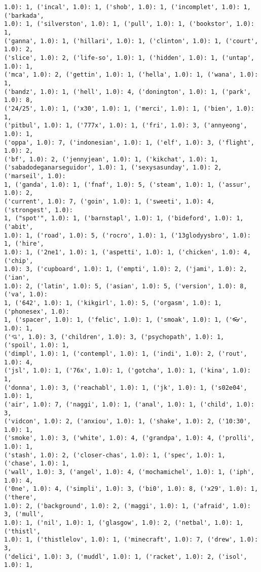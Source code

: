 \documentclass[11pt]{article}
\begin{document}
\begin{Verbatim}[commandchars=\\\{\}]
1.0): 1, ('incal', 1.0): 1, ('shob', 1.0): 1, ('incomplet', 1.0): 1, ('barkada',
1.0): 1, ('silverston', 1.0): 1, ('pull', 1.0): 1, ('bookstor', 1.0): 1,
('ganna', 1.0): 1, ('hillari', 1.0): 1, ('clinton', 1.0): 1, ('court', 1.0): 2,
('slice', 1.0): 2, ('life-so', 1.0): 1, ('hidden', 1.0): 1, ('untap', 1.0): 1,
('mca', 1.0): 2, ('gettin', 1.0): 1, ('hella', 1.0): 1, ('wana', 1.0): 1,
('bandz', 1.0): 1, ('hell', 1.0): 4, ('donington', 1.0): 1, ('park', 1.0): 8,
('24/25', 1.0): 1, ('x30', 1.0): 1, ('merci', 1.0): 1, ('bien', 1.0): 1,
('pitbul', 1.0): 1, ('777x', 1.0): 1, ('fri', 1.0): 3, ('annyeong', 1.0): 1,
('oppa', 1.0): 7, ('indonesian', 1.0): 1, ('elf', 1.0): 3, ('flight', 1.0): 2,
('bf', 1.0): 2, ('jennyjean', 1.0): 1, ('kikchat', 1.0): 1,
('sabadodeganarseguidor', 1.0): 1, ('sexysasunday', 1.0): 2, ('marseil', 1.0):
1, ('ganda', 1.0): 1, ('fnaf', 1.0): 5, ('steam', 1.0): 1, ('assur', 1.0): 2,
('current', 1.0): 7, ('goin', 1.0): 1, ('sweeti', 1.0): 4, ('strongest', 1.0):
1, ("spot'", 1.0): 1, ('barnstapl', 1.0): 1, ('bideford', 1.0): 1, ('abit',
1.0): 1, ('road', 1.0): 5, ('rocro', 1.0): 1, ('13glodyysbro', 1.0): 1, ('hire',
1.0): 1, ('2ne1', 1.0): 1, ('aspetti', 1.0): 1, ('chicken', 1.0): 4, ('chip',
1.0): 3, ('cupboard', 1.0): 1, ('empti', 1.0): 2, ('jami', 1.0): 2, ('ian',
1.0): 2, ('latin', 1.0): 5, ('asian', 1.0): 5, ('version', 1.0): 8, ('va', 1.0):
1, ('642', 1.0): 1, ('kikgirl', 1.0): 5, ('orgasm', 1.0): 1, ('phonesex', 1.0):
1, ('spacer', 1.0): 1, ('felic', 1.0): 1, ('smoak', 1.0): 1, ('👓', 1.0): 1,
('💘', 1.0): 3, ('children', 1.0): 3, ('psychopath', 1.0): 1, ('spoil', 1.0): 1,
('dimpl', 1.0): 1, ('contempl', 1.0): 1, ('indi', 1.0): 2, ('rout', 1.0): 4,
('jsl', 1.0): 1, ('76x', 1.0): 1, ('gotcha', 1.0): 1, ('kina', 1.0): 1,
('donna', 1.0): 3, ('reachabl', 1.0): 1, ('jk', 1.0): 1, ('s02e04', 1.0): 1,
('air', 1.0): 7, ('naggi', 1.0): 1, ('anal', 1.0): 1, ('child', 1.0): 3,
('vidcon', 1.0): 2, ('anxiou', 1.0): 1, ('shake', 1.0): 2, ('10:30', 1.0): 1,
('smoke', 1.0): 3, ('white', 1.0): 4, ('grandpa', 1.0): 4, ('prolli', 1.0): 1,
('stash', 1.0): 2, ('closer-chas', 1.0): 1, ('spec', 1.0): 1, ('chase', 1.0): 1,
('wall', 1.0): 3, ('angel', 1.0): 4, ('mochamichel', 1.0): 1, ('iph', 1.0): 4,
('0ne', 1.0): 4, ('simpli', 1.0): 3, ('bi0', 1.0): 8, ('x29', 1.0): 1, ('there',
1.0): 2, ('background', 1.0): 2, ('maggi', 1.0): 1, ('afraid', 1.0): 3, ('mull',
1.0): 1, ('nil', 1.0): 1, ('glasgow', 1.0): 2, ('netbal', 1.0): 1, ('thistl',
1.0): 1, ('thistlelov', 1.0): 1, ('minecraft', 1.0): 7, ('drew', 1.0): 3,
('delici', 1.0): 3, ('muddl', 1.0): 1, ('racket', 1.0): 2, ('isol', 1.0): 1,

\end{Verbatim}
\end{document}

